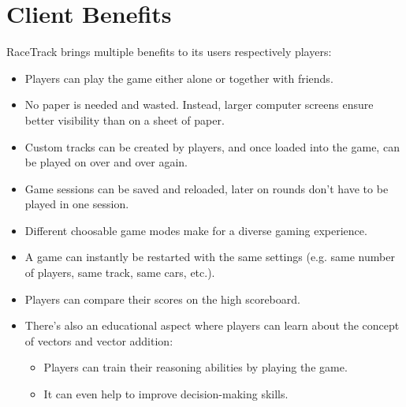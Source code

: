 \section{Client Benefits}
	RaceTrack brings multiple benefits to its users respectively players:
	\begin{itemize}
		\item Players can play the game either alone or together with friends.
		\item No paper is needed and wasted. Instead, larger computer screens ensure better visibility than on a sheet of paper.
		\item Custom tracks can be created by players, and once loaded into the game, can be played on over and over again.
		\item Game sessions can be saved and reloaded, later on rounds don't have to be played in one session.
		\item Different choosable game modes make for a diverse gaming experience.
		\item A game can instantly be restarted with the same settings (e.g. same number of players, same track, same cars, etc.).
		\item Players can compare their scores on the high scoreboard.
		\item There's also an educational aspect where players can learn about the concept of vectors and vector addition:
		\begin{itemize}
			\item Players can train their reasoning abilities by playing the game.
			\item It can even help to improve decision-making skills.
		\end{itemize}
	\end{itemize}